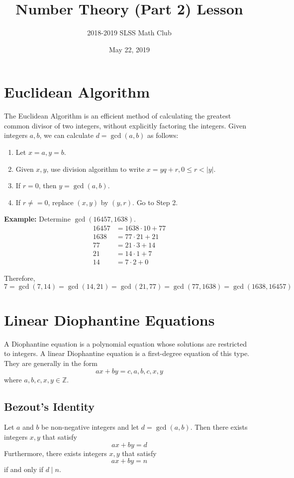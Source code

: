 \documentclass[12pt]{article}
\title{Number Theory (Part 2) Lesson\vspace{-3mm}}
\author{2018-2019 SLSS Math Club\vspace{-5mm}}
\date{May 22, 2019\vspace{-5mm}}
\newcommand{\tdiv}{\; | \;}
\begin{document}
\maketitle

\section{Euclidean Algorithm}
The Euclidean Algorithm is an efficient method of calculating the greatest common divisor of two integers, without explicitly factoring the integers. Given integers $a, b$, we can calculate $d = \gcd{(a, b)}$ as follows:
\begin{enumerate}
    \item Let $x = a, y = b$.
    \item Given $x, y$, use division algorithm to write $x = yq + r, 0 \leq r < |y|$.
    \item If $r = 0$, then $y = \gcd{(a, b)}$.
    \item If $r \neq = 0$, replace $(x, y)$ by $(y, r)$. Go to Step 2.
\end{enumerate}

\textbf{Example:} Determine $\gcd{(16457, 1638)}$.
\begin{align*}
    16457 &= 1638 \cdot 10 + 77 \\
    1638 &= 77 \cdot 21 + 21 \\
    77 &= 21 \cdot 3 + 14 \\
    21 &= 14 \cdot 1 + 7 \\
    14 &= 7 \cdot 2 + 0
\end{align*}

Therefore, $7 = \gcd{(7, 14)} = \gcd{(14, 21)} = \gcd{(21, 77)} = \gcd{(77, 1638)} = \gcd{(1638, 16457)}$

\section{Linear Diophantine Equations}
A Diophantine equation is a polynomial equation whose solutions are restricted to integers. A linear Diophantine equation is a first-degree equation of this type. They are generally in the form $$ax + by = c, a, b, c, x, y$$ where $a, b, c, x, y \in \mathbb{Z}$.

\subsection{Bezout's Identity}
Let $a$ and $b$ be non-negative integers and let $d = \gcd{(a, b)}$. Then there exists integers $x, y$ that satisfy $$ax + by = d$$ Furthermore, there exists integers $x, y$ that satisfy $$ax + by = n$$ if and only if $d \tdiv n$.
\end{document}
